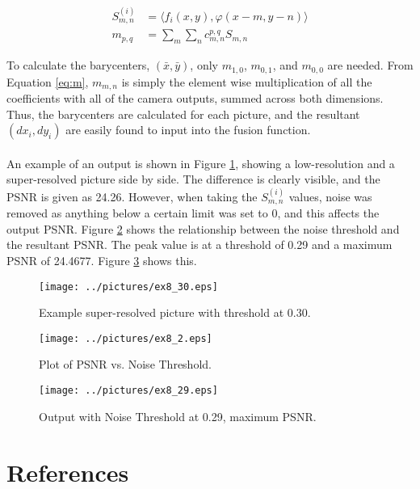 \documentclass[11pt,a4paper]{report}
\newcommand{\mychapter}[2]
{
    \setcounter{chapter}{#1}
    \setcounter{section}{0}
    \chapter*{#2}
    \addcontentsline{toc}{chapter}{#2}
}
\begin{document}
\begin{align}
    S^{(i)}_{m,n} &= \langle f_i (x, y), \varphi(x -m, y - n) \rangle \label{eq:S}\\
    m_{p,q} &= \sum_{m} \sum_{n} c^{p, q}_{m, n} S_{m,n} \label{eq:m}
\end{align}

To calculate the barycenters, $(\bar{x},\bar{y})$, only $m_{1,0}$, $m_{0,1}$, and $m_{0,0}$ are needed. From Equation \ref{eq:m}, $m_{m,n}$ is simply the element wise multiplication of all the coefficients with all of the camera outputs, summed across both dimensions. Thus, the barycenters are calculated for each picture, and the resultant $(dx_i, dy_i)$ are easily found to input into the fusion function.
\\\\
An example of an output is shown in Figure \ref{fig:ex8_30}, showing a low-resolution and a super-resolved picture side by side. The difference is clearly visible, and the PSNR is given as 24.26. However, when taking the $S^{(i)}_{m,n}$ values, noise was removed as anything below a certain limit was set to 0, and this affects the output PSNR. Figure \ref{fig:ex8_2} shows the relationship between the noise threshold and the resultant PSNR. The peak value is at a threshold of 0.29 and a maximum PSNR of 24.4677. Figure \ref{fig:ex8_29} shows this.

\begin{figure}[!ht]
    \centering
    \texttt{[image: ../pictures/ex8\_30.eps]}
    \caption{Example super-resolved picture with threshold at 0.30.}
    \label{fig:ex8_30}
\end{figure}

\begin{figure}[!ht]
    \centering
    \texttt{[image: ../pictures/ex8\_2.eps]}
    \caption{Plot of PSNR vs. Noise Threshold.}
    \label{fig:ex8_2}
\end{figure}

\begin{figure}[!ht]
    \centering
    \texttt{[image: ../pictures/ex8\_29.eps]}
    \caption{Output with Noise Threshold at 0.29, maximum PSNR.}
    \label{fig:ex8_29}
\end{figure}

\newpage
\mychapter{9}{References}
\begingroup
   \def\chapter*#1{}


\endgroup
\end{document}
